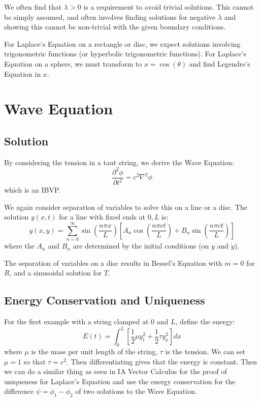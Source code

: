 \documentclass[../Main.tex]{subfiles}
\begin{document}
We often find that $\lambda > 0$ is a requirement to avoid trivial solutions. This cannot be simply assumed, and often involves finding solutions for negative $\lambda$ and showing this cannot be non-trivial with the given boundary conditions.

For Laplace's Equation on a rectangle or disc, we expect solutions involving trigonometric functions (or hyperbolic trigonometric functions). For Laplace's Equation on a sphere, we must transform to $x = \cos(\theta)$ and find Legendre's Equation in $x$.
\section{Wave Equation}
\subsection{Solution}
By considering the tension in a taut string, we derive the Wave Equation:
\begin{equation*}
    \frac{\partial^{2}\phi}{\partial t^{2}} = c^2 \nabla^2 \phi
\end{equation*}
which is an IBVP.

We again consider separation of variables to solve this on a line or a disc. The solution $y(x, t)$ for a line with fixed ends at $0, L$ is:
\begin{equation*}
    y(x, y) = \sum_{n=0}^{\infty} \sin\left(\frac{n\pi x}{L}\right) \left[A_n \cos\left(\frac{n\pi ct}{L}\right) + B_n \sin\left(\frac{n\pi c t}{L}\right)\right]
\end{equation*}
where the $A_n$ and $B_n$ are determined by the initial conditions (on $y$ and $\dot{y}$).

The separation of variables on a disc results in Bessel's Equation with $m = 0$ for $R$, and a sinusoidal solution for $T$.
\subsection{Energy Conservation and Uniqueness}
For the first example with a string clamped at $0$ and $L$, define the energy:
\begin{equation*}
    E(t) = \int_{0}^{L} \left[\frac12 \mu y_t^2 + \frac12 \tau y_x^2\right] dx
\end{equation*}
where $\mu$ is the mass per unit length of the string, $\tau$ is the tension. We can set $\mu = 1$ so that $\tau = c^2$. Then differentiating gives that the energy is constant. Then we can do a similar thing as seen in IA Vector Calculus for the proof of uniqueness for Laplace's Equation and use the energy conservation for the difference $\psi = \phi_1 - \phi_2$ of two solutions to the Wave Equation.
\end{document}
